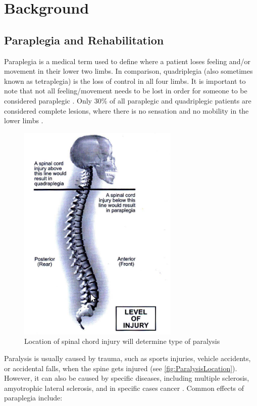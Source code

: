 \chapter{Background}

\section{Paraplegia and Rehabilitation}
Paraplegia is a medical term used to define where a patient loses feeling and/or movement in their lower two limbs. In comparison, quadriplegia (also sometimes known as tetraplegia) is the loss of control in all four limbs. It is important to note that not all feeling/movement needs to be lost in order for someone to be considered paraplegic \cite{IncompleteTraumaticQuadrilegia}. Only 30\% of all paraplegic and quadriplegic patients are considered complete lesions, where there is no sensation and no mobility in the lower limbs \cite{RehabParaplegia}. 

\begin{figure} [h!]
    \centering
    \includegraphics[width=0.5\linewidth]{Figures/Background/ParaQuadInjuryLocs.png}
    \caption{Location of spinal chord injury will determine type of paralysis \cite{RehabParaplegia}}
    \label{fig:ParalysisLocation}
\end{figure}

Paralysis is usually caused by trauma, such as sports injuries, vehicle accidents, or accidental falls, when the spine gets injured (see \autoref{fig:ParalysisLocation}). However, it can also be caused by specific diseases, including multiple sclerosis, amyotrophic lateral sclerosis, and in specific cases cancer \cite{CausesParaplegia}. Common effects of paraplegia include:
 
